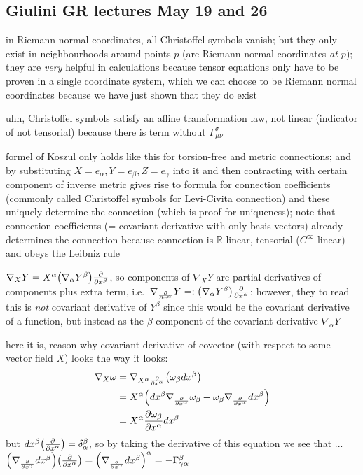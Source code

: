 \subsection{Giulini GR lectures May 19 and 26}
in Riemann normal coordinates, all Christoffel symbols vanish; but they only exist in neighbourhoods around points $p$ (are Riemann normal coordinates \emph{at $p$}); they are \emph{very} helpful in calculations because tensor equations only have to be proven in a single coordinate system, which we can choose to be Riemann normal coordinates because we have just shown that they do exist

uhh, Christoffel symbols satisfy an affine transformation law, not linear (indicator of not tensorial) because there is term without $\Gamma_{\mu \nu}^\sigma$


formel of Koszul only holds like this for torsion-free and metric connections; and by substituting $X = e_\alpha, Y = e_\beta, Z = e_\gamma$ into it and then contracting with certain component of inverse metric gives rise to formula for connection coefficients (commonly called Christoffel symbols for Levi-Civita connection) and these uniquely determine the connection (which is proof for uniqueness); note that connection coefficients (= covariant derivative with only basis vectors) already determines the connection because connection is $\mathbb{R}$-linear, tensorial ($C^\infty$-linear) and obeys the Leibniz rule

$\nabla_X Y = X^\alpha \qty(\nabla_\alpha Y^\beta) \pdv{x^\beta}$, so components of $\nabla_X Y$ are partial derivatives of components plus extra term, i.e.~$\nabla_{\pdv{x^\alpha}} Y =: \qty(\nabla_\alpha Y^\beta) \pdv{x^\alpha}$; however, they to read this is \emph{not} covariant derivative of $Y^\beta$ since this would be the covariant derivative of a function, but instead as the $\beta$-component of the covariant derivative $\nabla_\alpha Y$


here it is, reason why covariant derivative of covector (with respect to some vector field $X$) looks the way it looks:
\begin{align*}
\nabla_X \omega &= \nabla_{X^\alpha \pdv{x^\alpha}} \qty(\omega_\beta dx^\beta)
\\
&= X^\alpha \qty(dx^\beta \nabla_{\pdv{x^\alpha}} \omega_\beta + \omega_\beta \nabla_{\pdv{x^\alpha}} dx^\beta)
\\
&= X^\alpha \pdv{\omega_\beta}{x^\alpha} dx^\beta
\end{align*}
but $dx^\beta\qty(\pdv{x^\alpha}) = \delta_\alpha^\beta$, so by taking the derivative of this equation we see that ... $\qty(\nabla_{\pdv{x^\gamma}} dx^\beta)\qty(\pdv{x^\alpha}) = \qty(\nabla_{\pdv{x^\gamma}} dx^\beta)^\alpha = - \Gamma_{\gamma \alpha}^\beta$

